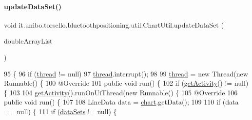 \paragraph{\texorpdfstring{update\+Data\+Set()}{updateDataSet()}}
{\footnotesize\ttfamily void it.\+unibo.\+torsello.\+bluetoothpositioning.\+util.\+Chart\+Util.\+update\+Data\+Set (\begin{DoxyParamCaption}\item[{final Array\+List$<$ Double $>$}]{double\+Array\+List }\end{DoxyParamCaption})}


\begin{DoxyCode}
95                                                                        \{
96         \textcolor{keywordflow}{if} (\hyperlink{classit_1_1unibo_1_1torsello_1_1bluetoothpositioning_1_1util_1_1ChartUtil_ac73af861c9ca49e226fe1218cef6c572_ac73af861c9ca49e226fe1218cef6c572}{thread} != null)
97             \hyperlink{classit_1_1unibo_1_1torsello_1_1bluetoothpositioning_1_1util_1_1ChartUtil_ac73af861c9ca49e226fe1218cef6c572_ac73af861c9ca49e226fe1218cef6c572}{thread}.interrupt();
98 
99         \hyperlink{classit_1_1unibo_1_1torsello_1_1bluetoothpositioning_1_1util_1_1ChartUtil_ac73af861c9ca49e226fe1218cef6c572_ac73af861c9ca49e226fe1218cef6c572}{thread} = \textcolor{keyword}{new} Thread(\textcolor{keyword}{new} Runnable() \{
100             @Override
101             \textcolor{keyword}{public} \textcolor{keywordtype}{void} run() \{
102                 \textcolor{keywordflow}{if} (\hyperlink{classit_1_1unibo_1_1torsello_1_1bluetoothpositioning_1_1util_1_1ChartUtil_a59150a6d20b6d0ad2fcf8c1ba858d355_a59150a6d20b6d0ad2fcf8c1ba858d355}{getActivity}() != null) \{
103 
104                     \hyperlink{classit_1_1unibo_1_1torsello_1_1bluetoothpositioning_1_1util_1_1ChartUtil_a59150a6d20b6d0ad2fcf8c1ba858d355_a59150a6d20b6d0ad2fcf8c1ba858d355}{getActivity}().runOnUiThread(\textcolor{keyword}{new} Runnable() \{
105                         @Override
106                         \textcolor{keyword}{public} \textcolor{keywordtype}{void} run() \{
107 
108                             LineData data = \hyperlink{classit_1_1unibo_1_1torsello_1_1bluetoothpositioning_1_1util_1_1ChartUtil_a6c34176fdfb85bac1d3aa1529b49ad5f_a6c34176fdfb85bac1d3aa1529b49ad5f}{chart}.getData();
109 
110                             \textcolor{keywordflow}{if} (data == null) \{
111                                 \textcolor{keywordflow}{if} (\hyperlink{classit_1_1unibo_1_1torsello_1_1bluetoothpositioning_1_1util_1_1ChartUtil_aa98bcaa2d5ba444b91cdc029768d380a_aa98bcaa2d5ba444b91cdc029768d380a}{dataSets} != null) \{

\end{DoxyCode}

